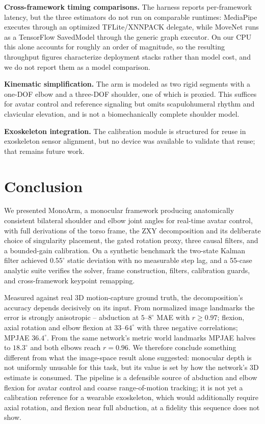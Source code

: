 \documentclass[conference]{IEEEtran}
\begin{document}
\textbf{Cross-framework timing comparisons.} The harness reports
per-framework latency, but the three estimators do not run on comparable
runtimes: MediaPipe executes through an optimized TFLite/XNNPACK
delegate, while MoveNet runs as a TensorFlow SavedModel through the
generic graph executor. On our CPU this alone accounts for roughly an
order of magnitude, so the resulting throughput figures characterize
deployment stacks rather than model cost, and we do not report them as a
model comparison.

\textbf{Kinematic simplification.} The arm is modeled as two rigid
segments with a one-DOF elbow and a three-DOF shoulder, one of which is
proxied. This suffices for avatar control and reference signaling but
omits scapulohumeral rhythm and clavicular elevation, and is not a
biomechanically complete shoulder model.

\textbf{Exoskeleton integration.} The calibration module is structured
for reuse in exoskeleton sensor alignment, but no device was available to
validate that reuse; that remains future work.

\section{Conclusion}
We presented MonoArm, a monocular framework producing anatomically
consistent bilateral shoulder and elbow joint angles for real-time avatar
control, with full derivations of the torso frame, the ZXY decomposition
and its deliberate choice of singularity placement, the gated rotation
proxy, three causal filters, and a bounded-gain calibration. On a
synthetic benchmark the two-state Kalman filter achieved $0.55^\circ$
static deviation with no measurable step lag, and a 55-case analytic
suite verifies the solver, frame construction, filters, calibration
guards, and cross-framework keypoint remapping.

Measured against real 3D motion-capture ground truth, the
decomposition's accuracy depends decisively on its input. From normalized
image landmarks the error is strongly anisotropic -- abduction at
$5$--$8^\circ$ MAE with $r\geq0.97$; flexion, axial rotation and elbow
flexion at $33$--$64^\circ$ with three negative correlations; MPJAE
$36.4^\circ$. From the same network's metric world landmarks MPJAE halves
to $18.3^\circ$ and both elbows reach $r=0.96$. We therefore conclude
something different from what the image-space result alone suggested:
monocular depth is not uniformly unusable for this task, but its value is
set by how the network's 3D estimate is consumed. The pipeline is a
defensible source of abduction and elbow flexion for avatar control and
coarse range-of-motion tracking; it is not yet a calibration reference
for a wearable exoskeleton, which would additionally require axial
rotation, and flexion near full abduction, at a fidelity this sequence
does not show.
\end{document}
